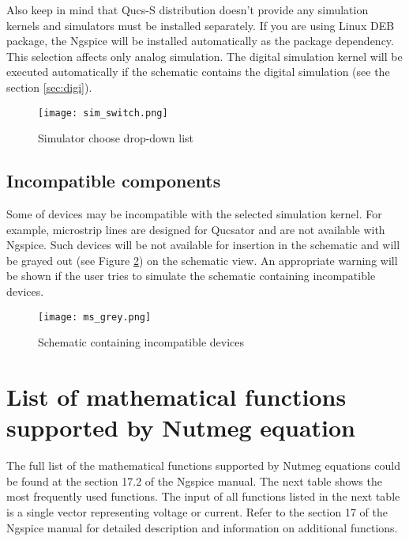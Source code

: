 Also keep in mind that Qucs-S distribution doesn't provide any simulation kernels and simulators must be installed separately. If you are using Linux DEB package, the Ngspice will be installed automatically as the package dependency. This selection affects only analog simulation. The digital simulation kernel will be executed automatically if the schematic contains the digital simulation (see the section \ref{sec:digi}).

    \begin{figure}[!ht]
    \begin{center}
        \texttt{[image: sim\_switch.png]}
    \end{center}
    \caption{Simulator choose drop-down list} \label{fig:sim_switch}
    \end{figure}

\subsection{Incompatible components}

Some of devices may be incompatible with the selected simulation kernel. For example, microstrip lines are designed for Qucsator and are not available with Ngspice. Such devices will be not available for insertion in the schematic and will be grayed out (see Figure \ref{fig:grey}) on the schematic view. An appropriate warning will be shown if the user tries to simulate the schematic containing incompatible devices.

    \begin{figure}[!ht]
    \begin{center}
        \texttt{[image: ms\_grey.png]}
    \end{center}
    \caption{Schematic containing incompatible devices} \label{fig:grey}
    \end{figure}

\section{List of mathematical functions supported by Nutmeg equation}

The full list of the mathematical functions supported by Nutmeg equations could be found at the section 17.2 of the Ngspice manual. The next table shows the most frequently used functions. The input of all functions listed in the next table is a single vector representing voltage or current. Refer to the section 17 of the Ngspice manual for detailed description and information on additional functions.

